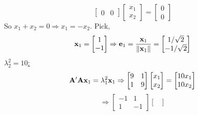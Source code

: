 \begin{enumerate}[label=(\alph*)]
\[\begin{bmatrix}
                    0 & 0
                \end{bmatrix}
                \begin{bmatrix}
                    x_1 \\
                    x_2
                \end{bmatrix}
                =
                \begin{bmatrix}
                    0 \\
                    0
                \end{bmatrix}
            \]
            So $x_1 + x_2 = 0 \Rightarrow x_1 = -x_2$. Pick,
            \[
                \bold{x}_1
                =
                \begin{bmatrix}
                    1 \\
                    -1
                \end{bmatrix}
                \Rightarrow
                \bold{e}_1
                =
                \frac{\bold{x}_1}{\left\|\bold{x}_1\right\|}
                =
                \begin{bmatrix}
                    1/\sqrt{2} \\
                    -1/\sqrt{2}
                \end{bmatrix}
            \]
            \underline{$\lambda_2^2 = 10$:}
            \[
                \bold{A}^\prime\bold{A}\bold{x}_1=\lambda_1^2\bold{x}_1
                \Rightarrow
                \begin{bmatrix}
                    9 & 1 \\
                    1 & 9
                \end{bmatrix}
                \begin{bmatrix}
                    x_1 \\
                    x_2
                \end{bmatrix}
                =
                \begin{bmatrix}
                    10x_1 \\
                    10x_2
                \end{bmatrix}
            \]
            \[
                \Rightarrow
                \begin{bmatrix}
                    -1 & 1 \\
                    1 & -1
                \end{bmatrix}
                \begin{bmatrix}

\end{bmatrix}\]
\end{enumerate}
